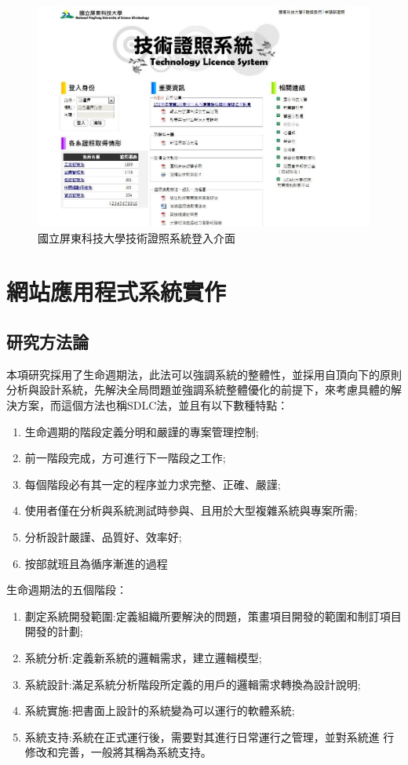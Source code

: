 \begin{figure}[h]
\centering \includegraphics[width=18cm,keepaspectratio]{ch2/2.1.jpg}
\caption{\label{fig:屏科大}國立屏東科技大學技術證照系統登入介面}
\end{figure}


\chapter{網站應用程式系統實作}

  \section{研究方法論}
本項研究採用了生命週期法，此法可以強調系統的整體性，並採用自頂向下的原則分析與設計系統，先解決全局問題並強調系統整體優化的前提下，來考慮具體的解決方案，而這個方法也稱SDLC法，並且有以下數種特點：
\begin{enumerate}[noitemsep]
\item 生命週期的階段定義分明和嚴謹的專案管理控制;
\item 前一階段完成，方可進行下一階段之工作;
\item 每個階段必有其一定的程序並力求完整、正確、嚴謹;
\item 使用者僅在分析與系統測試時參與、且用於大型複雜系統與專案所需;
\item 分析設計嚴謹、品質好、效率好;
\item 按部就班且為循序漸進的過程
\end{enumerate}

生命週期法的五個階段：
\begin{enumerate}[noitemsep]
\item 劃定系統開發範圍:定義組織所要解決的問題，策畫項目開發的範圍和制訂項目開發的計劃;
\item 系統分析:定義新系統的邏輯需求，建立邏輯模型;
\item 系統設計:滿足系統分析階段所定義的用戶的邏輯需求轉換為設計說明;
\item 系統實施:把書面上設計的系統變為可以運行的軟體系統;
\item 系統支持:系統在正式運行後，需要對其進行日常運行之管理，並對系統進 行修改和完善，一般將其稱為系統支持。
\end{enumerate}


